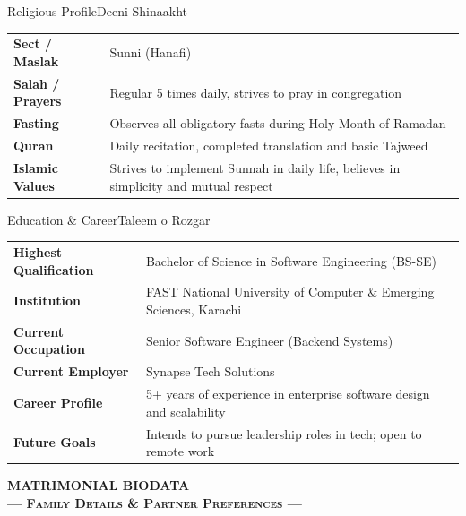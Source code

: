 \documentclass[11pt,a4paper]{article}
\begin{document}
\begin{biodatacard}{\faBookOpen}{Religious Profile}{Deeni Shinaakht}
  \begin{tabularx}{\linewidth}{>{\bfseries\color{emeraldgreen}\sffamily}l @{\quad:\quad} X}
    Sect / Maslak & Sunni (Hanafi) \\
    Salah / Prayers & Regular 5 times daily, strives to pray in congregation \\
    Fasting & Observes all obligatory fasts during Holy Month of Ramadan \\
    Quran & Daily recitation, completed translation and basic Tajweed \\
    Islamic Values & Strives to implement Sunnah in daily life, believes in simplicity and mutual respect \\
  \end{tabularx}
\end{biodatacard}

\begin{biodatacard}{\faGraduationCap}{Education \& Career}{Taleem o Rozgar}
  \begin{tabularx}{\linewidth}{>{\bfseries\color{emeraldgreen}\sffamily}l @{\quad:\quad} X}
    Highest Qualification & Bachelor of Science in Software Engineering (BS-SE) \\
    Institution & FAST National University of Computer \& Emerging Sciences, Karachi \\
    Current Occupation & Senior Software Engineer (Backend Systems) \\
    Current Employer & Synapse Tech Solutions \\
    Career Profile & 5+ years of experience in enterprise software design and scalability \\
    Future Goals & Intends to pursue leadership roles in tech; open to remote work \\
  \end{tabularx}
\end{biodatacard}

\newpage

\begin{tcolorbox}[
  colback=ivory,
  colframe=gold,
  arc=0pt,
  boxrule=1.5pt,
  top=6pt, bottom=6pt, left=15pt, right=15pt,
  halign=center,
  valign=center
]
  \centering
  {\color{emeraldgreen}\Large\sffamily\bfseries MATRIMONIAL BIODATA}\\[0.05cm]
  {\color{gold}\small\bfseries\scshape --- Family Details \& Partner Preferences ---}
\end{tcolorbox}
\end{document}
